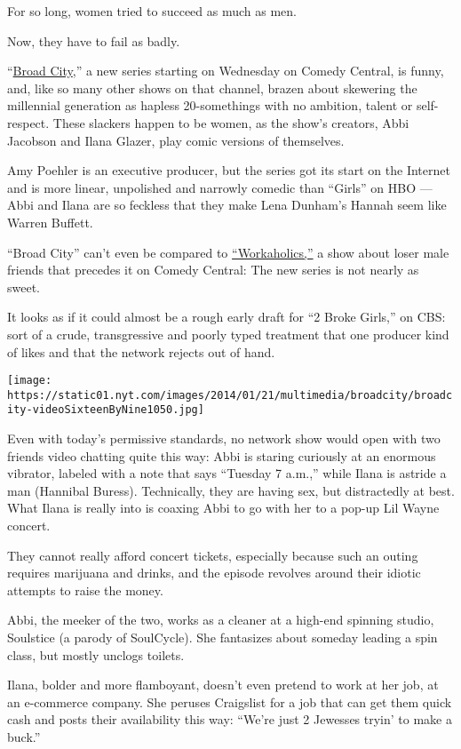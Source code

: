 For so long, women tried to succeed as much as men.

Now, they have to fail as badly.

``\href{http://www.comedycentral.com/shows/broad-city}{Broad City},'' a
new series starting on Wednesday on Comedy Central, is funny, and, like
so many other shows on that channel, brazen about skewering the
millennial generation as hapless 20-somethings with no ambition, talent
or self-respect. These slackers happen to be women, as the show's
creators, Abbi Jacobson and Ilana Glazer, play comic versions of
themselves.

Amy Poehler is an executive producer, but the series got its start on
the Internet and is more linear, unpolished and narrowly comedic than
``Girls'' on HBO --- Abbi and Ilana are so feckless that they make Lena
Dunham's Hannah seem like Warren Buffett.

``Broad City'' can't even be compared to
\href{http://www.comedycentral.com/shows/workaholics}{``Workaholics,''}
a show about loser male friends that precedes it on Comedy Central: The
new series is not nearly as sweet.

It looks as if it could almost be a rough early draft for ``2 Broke
Girls,'' on CBS: sort of a crude, transgressive and poorly typed
treatment that one producer kind of likes and that the network rejects
out of hand.

\texttt{[image: https://static01.nyt.com/images/2014/01/21/multimedia/broadcity/broadcity-videoSixteenByNine1050.jpg]}

Even with today's permissive standards, no network show would open with
two friends video chatting quite this way: Abbi is staring curiously at
an enormous vibrator, labeled with a note that says ``Tuesday 7 a.m.,''
while Ilana is astride a man (Hannibal Buress). Technically, they are
having sex, but distractedly at best. What Ilana is really into is
coaxing Abbi to go with her to a pop-up Lil Wayne concert.

They cannot really afford concert tickets, especially because such an
outing requires marijuana and drinks, and the episode revolves around
their idiotic attempts to raise the money.

Abbi, the meeker of the two, works as a cleaner at a high-end spinning
studio, Soulstice (a parody of SoulCycle). She fantasizes about someday
leading a spin class, but mostly unclogs toilets.

Ilana, bolder and more flamboyant, doesn't even pretend to work at her
job, at an e-commerce company. She peruses Craigslist for a job that can
get them quick cash and posts their availability this way: ``We're just
2 Jewesses tryin' to make a buck.''

